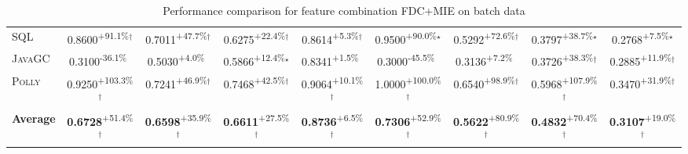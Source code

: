 \begin{table}[htbp]
\begin{tabular}{l|cccc|cccc}
\textsc{SQL} & \cellcolor{green!30}0.8600\textsuperscript{+91.1\%}$^\dagger$ & \cellcolor{green!30}0.7011\textsuperscript{+47.7\%}$^\dagger$ & \cellcolor{green!30}0.6275\textsuperscript{+22.4\%}$^\dagger$ & \cellcolor{green!30}0.8614\textsuperscript{+5.3\%}$^\dagger$ & \cellcolor{green!30}0.9500\textsuperscript{+90.0\%}$^\star$ & \cellcolor{green!30}0.5292\textsuperscript{+72.6\%}$^\dagger$ & \cellcolor{green!30}0.3797\textsuperscript{+38.7\%}$^\star$ & \cellcolor{green!30}0.2768\textsuperscript{+7.5\%}$^\star$ \\
\textsc{JavaGC} & \cellcolor{red!30}0.3100\textsuperscript{-36.1\%}$^{\,\,\,}$ & \cellcolor{green!30}0.5030\textsuperscript{+4.0\%}$^{\,\,\,}$ & \cellcolor{green!30}0.5866\textsuperscript{+12.4\%}$^\star$ & \cellcolor{green!30}0.8341\textsuperscript{+1.5\%}$^{\,\,\,}$ & \cellcolor{red!30}0.3000\textsuperscript{-45.5\%}$^{\,\,\,}$ & \cellcolor{green!30}0.3136\textsuperscript{+7.2\%}$^{\,\,\,}$ & \cellcolor{green!30}0.3726\textsuperscript{+38.3\%}$^\dagger$ & \cellcolor{green!30}0.2885\textsuperscript{+11.9\%}$^\dagger$ \\
\textsc{Polly} & \cellcolor{green!30}0.9250\textsuperscript{+103.3\%}$^\dagger$ & \cellcolor{green!30}0.7241\textsuperscript{+46.9\%}$^\dagger$ & \cellcolor{green!30}0.7468\textsuperscript{+42.5\%}$^\dagger$ & \cellcolor{green!30}0.9064\textsuperscript{+10.1\%}$^\dagger$ & \cellcolor{green!30}1.0000\textsuperscript{+100.0\%}$^\dagger$ & \cellcolor{green!30}0.6540\textsuperscript{+98.9\%}$^\dagger$ & \cellcolor{green!30}0.5968\textsuperscript{+107.9\%}$^\dagger$ & \cellcolor{green!30}0.3470\textsuperscript{+31.9\%}$^\dagger$ \\
\hline
\textbf{Average} & \cellcolor{green!30}\textbf{0.6728}\textsuperscript{+51.4\%}$^\dagger$ & \cellcolor{green!30}\textbf{0.6598}\textsuperscript{+35.9\%}$^\dagger$ & \cellcolor{green!30}\textbf{0.6611}\textsuperscript{+27.5\%}$^\dagger$ & \cellcolor{green!30}\textbf{0.8736}\textsuperscript{+6.5\%}$^\dagger$ & \cellcolor{green!30}\textbf{0.7306}\textsuperscript{+52.9\%}$^\dagger$ & \cellcolor{green!30}\textbf{0.5622}\textsuperscript{+80.9\%}$^\dagger$ & \cellcolor{green!30}\textbf{0.4832}\textsuperscript{+70.4\%}$^\dagger$ & \cellcolor{green!30}\textbf{0.3107}\textsuperscript{+19.0\%}$^\dagger$ \\
\hline
\end{tabular}
\caption{Performance comparison for feature combination FDC+MIE on batch data}
\label{tab:combo_FDC_MIE_performance_batch}
\end{table}